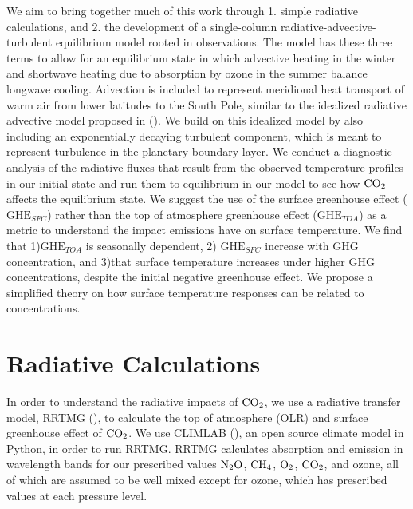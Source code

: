 \documentclass[draft]{agujournal2019}
\begin{document}
We aim to bring together much of this work through 1. simple radiative calculations, and 2. the development of a single-column radiative-advective-turbulent equilibrium model rooted in observations. The model has these three terms to allow for an equilibrium state in which advective heating in the winter and shortwave heating due to absorption by ozone in the summer balance longwave cooling. Advection is included to represent meridional heat transport of warm air from lower latitudes to the South Pole, similar to the idealized radiative advective model proposed in (\cite{cronin_analytic_2016}). We build on this idealized model by also including an exponentially decaying turbulent component, which is meant to represent turbulence in the planetary boundary layer. We conduct a diagnostic analysis of the radiative fluxes that result from the observed temperature profiles in our initial state and run them to equilibrium in our model to see how $\ce{CO_2}$ affects the equilibrium state. We suggest the use of the surface greenhouse effect ($\text{GHE}_{SFC}$) rather than the top of atmosphere greenhouse effect ($\text{GHE}_{TOA}$) as a metric to understand the impact  emissions have on surface temperature. We find that 1)$\text{GHE}_{TOA}$ is seasonally dependent, 2) $\text{GHE}_{SFC}$ increase with GHG concentration, and 3)that surface temperature increases under higher GHG concentrations, despite the initial negative greenhouse effect. We propose a simplified theory on how surface temperature responses can be related to  concentrations.

\section{Radiative Calculations}

In order to understand the radiative impacts of $\ce{CO_2}$, we use a radiative transfer model, RRTMG (\cite{mlawer_radiative_1997}), to calculate the top of atmosphere (OLR) and surface greenhouse effect of $\ce{CO_2}$. We use CLIMLAB (\cite{rose_climlab_2018}), an open source climate model in Python, in order to run RRTMG. RRTMG calculates absorption and emission in wavelength bands for our prescribed values $\ce{N_2O}$, $\ce{CH_4}$, $\ce{O_2}$, $\ce{CO_2}$, and ozone, all of which are assumed to be well mixed except for ozone, which has prescribed values at each pressure level. 
\end{document}
